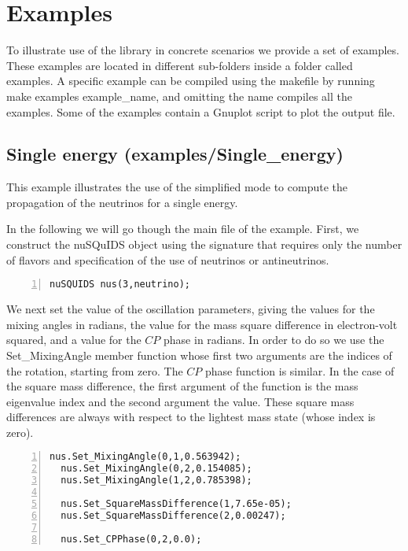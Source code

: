 \documentclass[3p,12pt]{elsarticle}
\newcommand{\ttf}{\ttfamily}
\begin{document}
\ifdefined\forjournal
\else
\ifdefined\manualonly
\else
\appendix
\fi %

\section{Examples}
\label{sec:examples}
To illustrate use of the library in concrete scenarios we provide
a set of examples. These examples are located in different sub-folders inside a folder
called {\ttf examples}. A specific example can be compiled using the
makefile by running {\ttf make examples example\_name}, and omitting the
name compiles all the examples. 
Some of the examples contain a {\ttf Gnuplot} script to plot the output file.

\subsection{Single energy \textnormal{({\ttf examples/Single\_energy})}}
\label{sec:single}
This example illustrates the use of the simplified mode to compute the
propagation of the neutrinos for a single energy. 

In the following we will go though the main file of the example.
First, we construct the nuSQuIDS object using the signature that
requires only the number of flavors and specification of the use of
neutrinos or antineutrinos.

\begin{lstlisting}[frame=leftline, numbers = left,breaklines=true, label = ex:sin1]
  nuSQUIDS nus(3,neutrino);
\end{lstlisting}

We next set the value of the oscillation parameters, giving the values for the mixing angles in radians, the value for the mass
square difference in electron-volt squared, and a value for the $CP$
phase in radians.
In order to do so we use the {\ttf Set\_MixingAngle} member function
whose first two arguments are the indices of the rotation, starting
from zero. The $CP$ phase function is similar.
In the case of the square mass difference, the first argument of the function is
the mass eigenvalue index and the second argument the value. These
square mass differences are always with respect to the lightest mass state (whose index is zero).
 
\begin{lstlisting}[frame=leftline, numbers = left,breaklines=true, label = ex:sin1,firstnumber=last]
  nus.Set_MixingAngle(0,1,0.563942);
  nus.Set_MixingAngle(0,2,0.154085);
  nus.Set_MixingAngle(1,2,0.785398);

  nus.Set_SquareMassDifference(1,7.65e-05);
  nus.Set_SquareMassDifference(2,0.00247);

  nus.Set_CPPhase(0,2,0.0);
\end{lstlisting}
\end{document}
